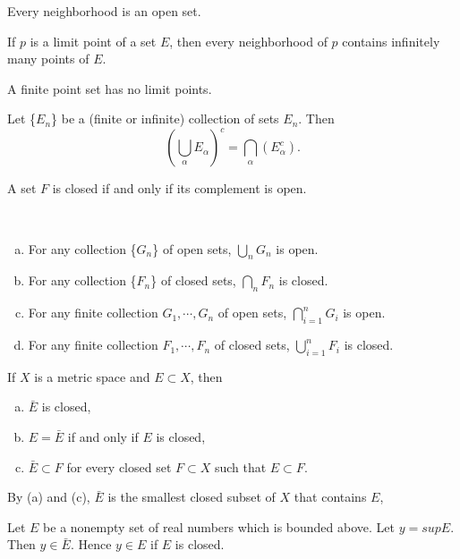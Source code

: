 \begin{theorem}
	Every neighborhood is an open set.
\end{theorem}

\begin{theorem}
	If $p$ is a limit point of a set $E$, then every neighborhood of $p$ contains infinitely many points of $E$.
\end{theorem}

\begin{corollary}
	A finite point set has no limit points.
\end{corollary}

\begin{theorem}
	Let \{$E_n$\} be a (finite or infinite) collection of sets $E_n$. Then $$\left(\bigcup _\alpha E_\alpha\right)^c = \bigcap_\alpha \left(E_\alpha^c\right).$$
\end{theorem}

\begin{theorem}
	A set $F$ is closed if and only if its complement is open.
\end{theorem}
\begin{theorem}
	~
	\begin{enumerate}[(a)]
	\item For any collection \{$G_n$\} of open sets, $\bigcup_n G_n$ is open.
	\item For any collection \{$F_n$\} of closed sets, $\bigcap_n F_n$ is closed.
	\item For any finite collection $G_1, \cdots, G_n$ of open sets, $\bigcap_{i=1}^n G_i $ is open.
	\item For any finite collection $F_1, \cdots, F_n$ of closed sets, $\bigcup_{i=1}^n F_i $ is closed.
	\end{enumerate}
\end{theorem}

\begin{theorem}
	If $X$ is a metric space and $E\subset X$, then
	\begin{enumerate}[(a)]
	\item $\bar E$ is closed,
	\item $E=\bar E$ if and only if $E$ is closed,
	\item $\bar E \subset F$ for every closed set $F\subset X$ such that $E \subset F$.
	\end{enumerate}
	By (a) and (c), $\bar E$ is the smallest closed subset of $X$ that contains $E$,
\end{theorem}

\begin{theorem}
	Let $E$ be a nonempty set of real numbers which is bounded above. Let $y = sup E$. Then $y \in \bar E$. Hence $y \in E$ if $E$ is closed.
\end{theorem}

